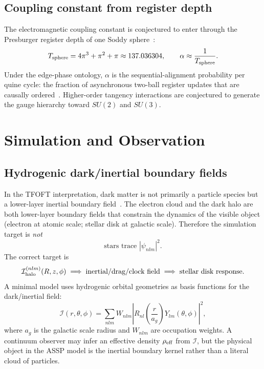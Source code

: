 \documentclass[11pt,a4paper]{article}
\begin{document}
\subsection{Coupling constant from register depth}

The electromagnetic coupling constant is conjectured to enter through the
Presburger register depth of one Soddy sphere~\cite{TFOFT2026,Soddy1936}:
\begin{equation}
  T_{\rm sphere}=4\pi^3+\pi^2+\pi\approx137.036304,
  \qquad
  \alpha\approx\frac{1}{T_{\rm sphere}}.
  \label{eq:alpha}
\end{equation}
Under the edge-phase ontology, $\alpha$ is the sequential-alignment probability
per quine cycle: the fraction of asynchronous two-ball register updates that
are causally ordered~\cite{TFOFT2026}. Higher-order tangency interactions are
conjectured to generate the gauge hierarchy toward $SU(2)$ and $SU(3)$.

\section{Simulation and Observation}

\subsection{Hydrogenic dark/inertial boundary fields}

In the TFOFT interpretation, dark matter is not primarily a particle species
but a lower-layer inertial boundary field~\cite{TFOFT2026}. The electron cloud
and the dark halo are both lower-layer boundary fields that constrain the
dynamics of the visible object (electron at atomic scale; stellar disk at
galactic scale). Therefore the simulation target is \emph{not}
\[
  \text{stars trace }|\psi_{nlm}|^2.
\]
The correct target is
\begin{equation}
  \mathcal{I}_{\rm halo}^{(nlm)}(R,z,\phi)
  \;\Longrightarrow\;
  \text{inertial/drag/clock field}
  \;\Longrightarrow\;
  \text{stellar disk response}.
  \label{eq:target}
\end{equation}
A minimal model uses hydrogenic orbital geometries as basis functions for the
dark/inertial field:
\begin{equation}
  \mathcal{I}(r,\theta,\phi)
  =\sum_{nlm}W_{nlm}
    \left|R_{nl}\!\left(\frac{r}{a_g}\right)Y_{lm}(\theta,\phi)\right|^2,
  \label{eq:inertia_basis}
\end{equation}
where $a_g$ is the galactic scale radius and $W_{nlm}$ are occupation weights.
A continuum observer may infer an effective density $\rho_{\rm eff}$ from
$\mathcal I$, but the physical object in the ASSP model is the inertial
boundary kernel rather than a literal cloud of particles.
\end{document}
